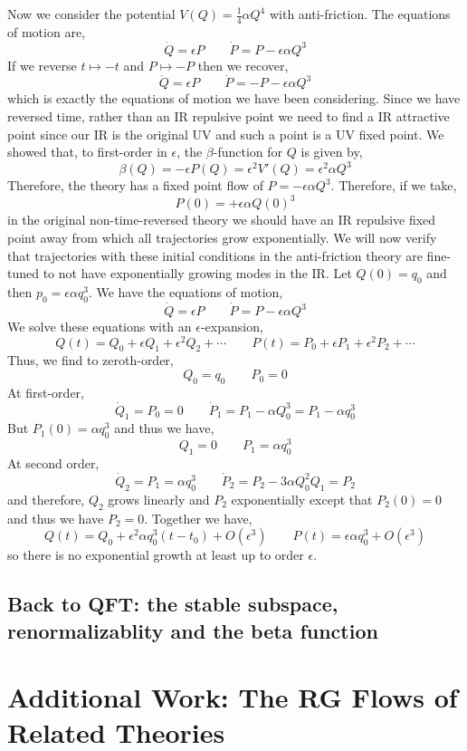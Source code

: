 \documentclass[12pt]{article}
\begin{document}
Now we consider the potential $V(Q) = \tfrac{1}{4} \alpha Q^4$ with anti-friction. The equations of motion are,
\[ \dot{Q} = \epsilon P \quad \quad \dot{P} = P - \epsilon \alpha Q^3 \]
If we reverse $t \mapsto - t$ and $P \mapsto - P$ then we recover,
\[ \dot{Q} = \epsilon P \quad \quad \dot{P} = - P - \epsilon \alpha Q^3 \]
which is exactly the equations of motion we have been considering. Since we have reversed time, rather than an IR repulsive point we need to find a IR attractive point since our IR is the original UV and such a point is a UV fixed point. We showed that, to first-order in $\epsilon$, the $\beta$-function for $Q$ is given by,
\[ \beta(Q) = - \epsilon P(Q) = \epsilon^2 V'(Q) = \epsilon^2 \alpha Q^3 \] 
Therefore, the theory has a fixed point flow of $P = - \epsilon \alpha Q^3$. Therefore, if we take,
\[ P(0) = + \epsilon \alpha Q(0)^3 \]
in the original non-time-reversed theory we should have an IR repulsive fixed point away from which all trajectories grow exponentially. We will now verify that trajectories with these initial conditions in the anti-friction theory are fine-tuned to not have exponentially growing modes in the IR. Let $Q(0) = q_0$ and then $p_0 = \epsilon \alpha q_0^3$. We have the equations of motion,
\[ \dot{Q} = \epsilon P \quad \quad \dot{P} = P - \epsilon \alpha Q^3 \] 
We solve these equations with an $\epsilon$-expansion,
\[ Q(t) = Q_0 + \epsilon Q_1 + \epsilon^2 Q_2 + \cdots \quad \quad P(t) = P_0 + \epsilon P_1 + \epsilon^2 P_2 + \cdots \]
Thus, we find to zeroth-order,
\[ Q_0 = q_0 \quad \quad P_0 = 0 \]
At first-order, 
\[ \dot{Q}_1 = P_0 = 0 \quad \quad \dot{P}_1 = P_1 - \alpha Q_0^3 = P_1 - \alpha q_0^3 \]
But $P_1(0) = \alpha q_0^3$ and thus we have,
\[ Q_1 = 0 \quad \quad P_1 = \alpha q_0^3 \]
At second order,
\[ \dot{Q}_2 = P_1 = \alpha q_0^3 \quad \quad \dot{P}_2 = P_2 - 3 \alpha Q_0^2 Q_1 = P_2 \]
and therefore, $Q_2$ grows linearly and $P_2$ exponentially except that $P_2(0) = 0$ and thus we have $P_2 = 0$. Together we have, 
\[ Q(t) = Q_0 + \epsilon^2 \alpha q_0^3 (t - t_0) + O(\epsilon^3) \quad \quad P(t) = \epsilon \alpha q_0^3 + O(\epsilon^3) \]
so there is no exponential growth at least up to order $\epsilon$. 

\subsection{Back to QFT: the stable subspace, renormalizablity and the beta function}

\section{Additional Work: The RG Flows of Related Theories}
\end{document}
